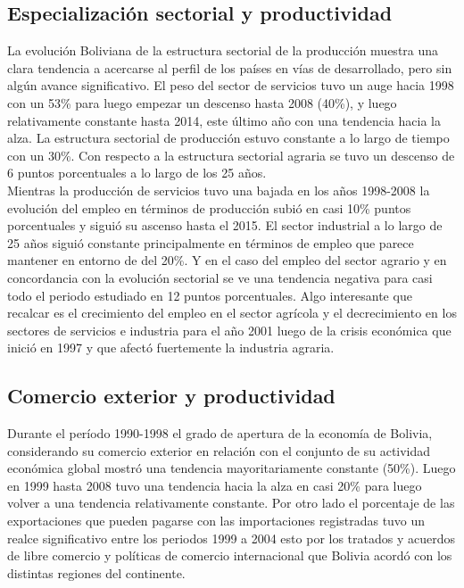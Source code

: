     \subsection{Especialización sectorial y productividad}
    La evolución Boliviana de la estructura sectorial de la producción muestra una clara tendencia a acercarse al perfil de los países en vías de desarrollado, pero sin algún avance significativo. El peso del sector de servicios tuvo un auge hacia 1998 con un 53\% para luego empezar un descenso hasta 2008 (40\%), y luego relativamente constante hasta 2014, este último año con una tendencia hacia la alza. La estructura sectorial de producción estuvo constante a lo largo de tiempo con un 30\%. Con respecto a la estructura sectorial agraria se tuvo un descenso de 6 puntos porcentuales a lo largo de los 25 años.\\

    Mientras la producción de servicios tuvo una bajada en los años 1998-2008 la evolución del empleo en términos de producción subió en casi 10\% puntos porcentuales y siguió su ascenso hasta el 2015. El sector industrial a lo largo de 25 años siguió constante principalmente en términos de empleo que parece mantener en entorno de del 20\%. Y en el caso del empleo del sector agrario y en concordancia con la evolución sectorial se ve una tendencia negativa para casi todo el periodo estudiado en 12 puntos porcentuales. Algo interesante que recalcar es el crecimiento del empleo en el sector agrícola y el decrecimiento en los sectores de servicios e industria para el año 2001 luego de la crisis económica que inició en 1997 y que afectó fuertemente la industria agraria.\\ 

    \subsection{Comercio exterior y productividad}
    Durante el período 1990-1998 el  grado de apertura de la economía de Bolivia, considerando su comercio exterior en relación con el conjunto de su actividad económica global mostró una tendencia mayoritariamente constante (50\%). Luego en 1999 hasta 2008 tuvo una tendencia hacia la alza en casi 20\% para luego volver a una tendencia relativamente constante. Por otro lado el porcentaje de las exportaciones que pueden pagarse con las importaciones registradas tuvo un realce significativo entre los periodos 1999 a 2004 esto por los tratados y acuerdos de libre comercio y políticas de comercio internacional que Bolivia acordó con los distintas regiones del continente.\\

